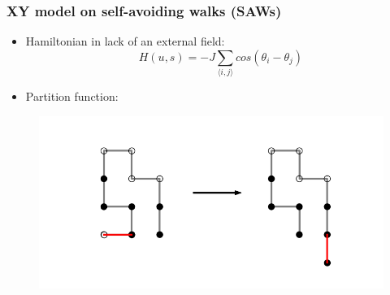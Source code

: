 \documentclass{beamer}
\begin{document}
\begin{frame}
	\frametitle{XY model on self-avoiding walks (SAWs)}
	\begin{multicols}{2}
		
		\begin{itemize}
			\item Hamiltonian in lack of an external field: 
			\begin{equation*}
			H(u,s) = -J \sum_{ \langle i, j \rangle } cos(\theta_i - \theta_j)  
			\end{equation*}
			\item Partition function:
			
			
		\end{itemize}
		
		\columnbreak
		
		\begin{figure}[H]
			\centering
			\includegraphics[scale=0.3]{snakeupdate.png}
			\label{fig:example}
		\end{figure}
		
	\end{multicols}
\end{frame}



  
\end{document}
